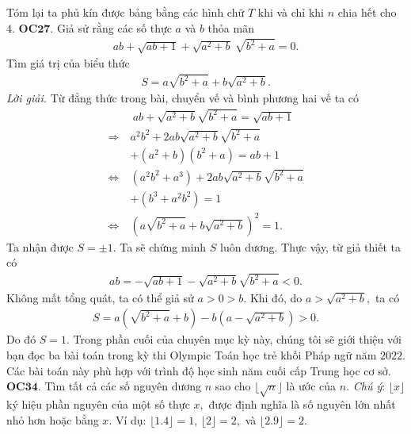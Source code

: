 \begin{multicols}{2}
\begin{figure}[H]
		\vspace*{-5pt}
	\end{figure}
	Tóm lại ta phủ kín được bảng bằng các hình chữ $T$ khi và chỉ khi $n$ chia hết cho $4$.
	\vskip 0.1cm
	{\bf\color{cackithi} OC$\pmb{27.}$} Giả sử rằng các số thực $a$ và $b$ thỏa mãn
	\begin{align*}
		ab+ \sqrt{ab+1} +\sqrt{a^2+b}\ \sqrt{b^2+a}=0.
	\end{align*}
	Tìm giá trị của biểu thức
	\begin{align*}
		S=a\sqrt{b^2+a} + b\sqrt{a^2+b}.
	\end{align*}
	\textit{\textit{Lời giải}.} Từ đẳng thức trong bài, chuyển vế và bình phương hai vế ta có
	\begin{align*}
		& \ ab+ \sqrt{a^2+b} \sqrt{b^2+a} = \sqrt{ab+1} \\
		\Rightarrow\  &	a^2b^2 + 2ab\sqrt{a^2+b} \sqrt{b^2+a} \\
		&+ (a^2+b)(b^2+a) = ab+1\\
		\Leftrightarrow\  &	(a^2b^2+a^3) + 2ab\sqrt{a^2+b} \sqrt{b^2+a} \\
		&+ (b^3+a^2b^2) = 1\\
		\Leftrightarrow\ 	& (a\sqrt{b^2+a} + b\sqrt{a^2+b})^2 = 1.
	\end{align*}
	Ta nhận được $S=\pm 1.$ Ta sẽ chứng minh $S$ luôn dương. Thực vậy, từ giả thiết ta có
	\begin{align*}
		ab= -\sqrt{ab+1} -\sqrt{a^2+b} \sqrt{b^2+a} <0.
	\end{align*}
	Không mất tổng quát, ta có thể giả sử \linebreak $a>0>b.$ Khi đó, do $a>\sqrt{a^2+b},$ ta có
	\begin{align*}
		S= a( \sqrt{b^2+a} +b)- b(a- \sqrt{a^2+b})>0.
	\end{align*} 
	Do đó  $S=1$.
	\vskip 0.1cm
	Trong phần cuối của chuyên mục kỳ này, chúng tôi sẽ giới thiệu với bạn đọc ba bài toán trong kỳ thi Olympic Toán học trẻ khối Pháp ngữ năm $2022$. Các bài toán này phù hợp với trình độ học sinh năm cuối cấp Trung học cơ sở.
	\vskip 0.1cm
	{\bf\color{cackithi} OC$\pmb{34.}$} Tìm tất cả các số nguyên dương $n$ sao cho $ \lfloor \sqrt{n}\rfloor $ là ước của $n.$ 
	\vskip 0.1cm
	\textit{Chú ý}: $ \lfloor x \rfloor $ ký hiệu phần nguyên của một số thực $x,$ được định nghĩa là số nguyên lớn nhất nhỏ hơn hoặc bằng $x.$ Ví dụ: $ \lfloor 1.4 \rfloor =1$, $ \lfloor 2 \rfloor=2,$ và  $ \lfloor 2.9 \rfloor= 2.$  

\end{multicols}
